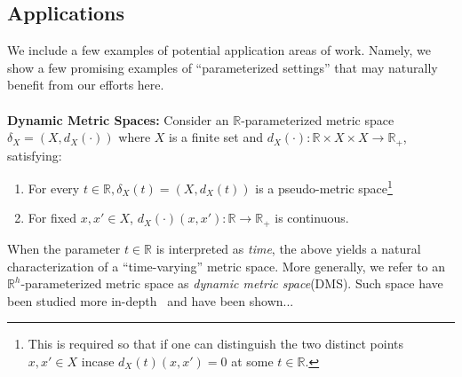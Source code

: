 \documentclass[10pt]{article}
\numberwithin{equation}{section}
\newcommand{\+}{%
	\raisebox{0.18ex}{\scaleobj{0.55}{+}}
}
\theoremstyle{definition}
\begin{document}
\subsection*{Applications}
We include a few examples of potential application areas of work. Namely, we show a few promising examples of ``parameterized settings'' that may naturally benefit from our efforts here.
\\
\\ 
\textbf{Dynamic Metric Spaces:} Consider an $\mathbb{R}$-parameterized metric space $\delta_X = ( X, d_X(\cdot) )$ where $X$ is a finite set and $d_X(\cdot): \mathbb{R} \times X \times X \to \mathbb{R}_{+}$, satisfying: 
\begin{enumerate}
	\item For every $t \in \mathbb{R}, \delta_X(t) = (X, d_X(t))$ is a pseudo-metric space\footnote{This is required so that if one can distinguish the two distinct points $x, x' \in X$ incase $d_X(t)(x, x') = 0$ at some $t \in \mathbb{R}$. } 
	\item For fixed $x, x' \in X$, $d_X(\cdot)(x, x'): \mathbb{R} \to \mathbb{R}_{+}$ is continuous.
\end{enumerate}
When the parameter $t \in \mathbb{R}$ is interpreted as \emph{time}, the above yields a natural characterization of a ``time-varying'' metric space. More generally, we refer to an $\mathbb{R}^h$-parameterized metric space as \emph{dynamic metric space}(DMS). 
Such space have been studied more in-depth~\cite{} and have been shown...


\end{document}
